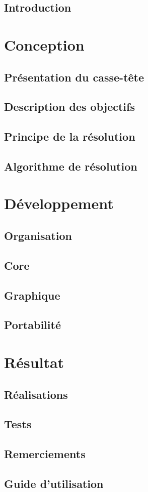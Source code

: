\documentclass[a4paper,10pt]{report}
\begin{document}
\tableofcontents

\chapter*{Introduction}


\part{Conception}
\chapter{Présentation du casse-tête}

\chapter{Description des objectifs} 
 
\chapter{Principe de la résolution}

\chapter{Algorithme de résolution}


\part{Développement}
\chapter{Organisation}

\chapter{Core}\label{ch6}

\chapter{Graphique}

\chapter{Portabilité}


\part{Résultat}
\chapter{Réalisations}

\chapter{Tests}\label{Tests}


\chapter*{Remerciements}

\appendix
\chapter*{Guide d'utilisation}


\listoffigures
\listoftables
\lstlistoflistings

\printindex
\end{document}

